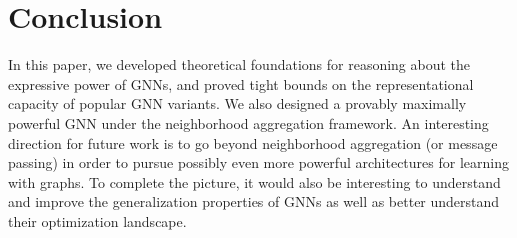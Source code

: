 
\vspace*{-5pt}

\section{Conclusion} 
\label{sec:conclusion}

In this paper, we developed theoretical foundations for reasoning about the expressive power of GNNs, and proved tight bounds on the representational capacity of popular GNN variants. We also designed a provably maximally powerful GNN under the neighborhood aggregation framework. An interesting direction for future work is to go beyond neighborhood aggregation (or message passing) in order to pursue possibly even more powerful architectures for learning with graphs. To complete the picture, it would also be interesting to understand and improve the generalization properties of GNNs as well as better understand their optimization landscape.
